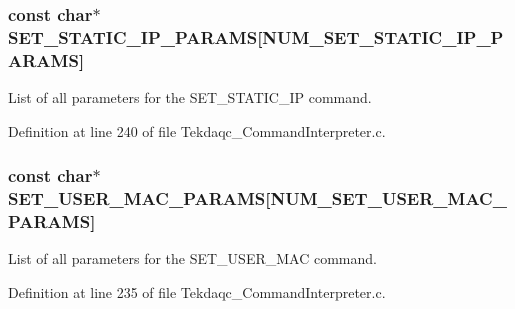 \hypertarget{group__command__interpreter_ga27977b5ae6f92883015ee0cb83d54617}{
\subsubsection[{S\-E\-T\-\_\-\-S\-T\-A\-T\-I\-C\-\_\-\-I\-P\-\_\-\-P\-A\-R\-A\-M\-S}]{\setlength{\rightskip}{0pt plus 5cm}const char$\ast$ S\-E\-T\-\_\-\-S\-T\-A\-T\-I\-C\-\_\-\-I\-P\-\_\-\-P\-A\-R\-A\-M\-S\mbox{[}{\bf N\-U\-M\-\_\-\-S\-E\-T\-\_\-\-S\-T\-A\-T\-I\-C\-\_\-\-I\-P\-\_\-\-P\-A\-R\-A\-M\-S}\mbox{]}}}\label{group__command__interpreter_ga27977b5ae6f92883015ee0cb83d54617}
List of all parameters for the S\-E\-T\-\_\-\-S\-T\-A\-T\-I\-C\-\_\-\-I\-P command. 

Definition at line 240 of file Tekdaqc\-\_\-\-Command\-Interpreter.\-c.

\hypertarget{group__command__interpreter_gac5a3a40f966d23af1d572909c1d8e952}{
\subsubsection[{S\-E\-T\-\_\-\-U\-S\-E\-R\-\_\-\-M\-A\-C\-\_\-\-P\-A\-R\-A\-M\-S}]{\setlength{\rightskip}{0pt plus 5cm}const char$\ast$ S\-E\-T\-\_\-\-U\-S\-E\-R\-\_\-\-M\-A\-C\-\_\-\-P\-A\-R\-A\-M\-S\mbox{[}{\bf N\-U\-M\-\_\-\-S\-E\-T\-\_\-\-U\-S\-E\-R\-\_\-\-M\-A\-C\-\_\-\-P\-A\-R\-A\-M\-S}\mbox{]}}}\label{group__command__interpreter_gac5a3a40f966d23af1d572909c1d8e952}
List of all parameters for the S\-E\-T\-\_\-\-U\-S\-E\-R\-\_\-\-M\-A\-C command. 

Definition at line 235 of file Tekdaqc\-\_\-\-Command\-Interpreter.\-c.

